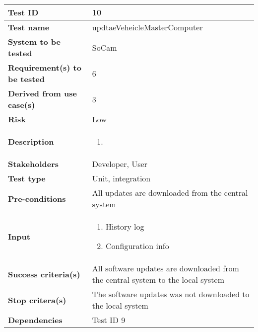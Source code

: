 		\begin{table}[H]
			\begin{tabular}{| p{4cm} | p{10cm} |}
			\hline
			\rowcolor{gray}
				{\bf Test ID} & 10 \\ \hline
				{\bf Test name} & updtaeVeheicleMasterComputer \\ \hline
				{\bf System to be tested} & SoCam \\ \hline
				{\bf Requirement(s) to be tested} & 6 \\ \hline
				{\bf Derived from use case(s)} & 3 \\ \hline
				{\bf Risk} & Low \\ \hline
				{\bf Description} & 
					\begin{enumerate}
						\item 
					\end{enumerate}
				\\ \hline
				{\bf Stakeholders} & Developer, User \\ \hline
				{\bf Test type} & Unit, integration \\ \hline
				{\bf Pre-conditions} & All updates are downloaded from the central system \\ \hline
				{\bf Input} & 
					\begin{enumerate}
						\item History log
						\item Configuration info
					\end{enumerate}
				\\ \hline
				{\bf Success criteria(s)} &  All software updates are downloaded from the central system 
						to the local system \\ \hline
				{\bf Stop critera(s)} &  The software updates was not downloaded to the 
					local system \\ \hline
				{\bf Dependencies} & Test ID 9 \\ \hline
			\end{tabular}
		\end{table}

